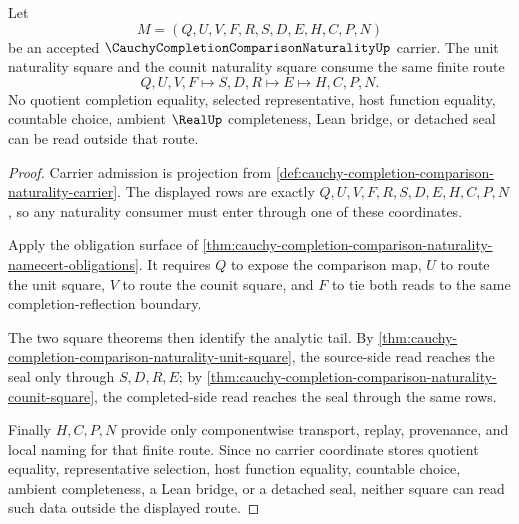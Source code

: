 \begin{theorem}
\label{thm:cauchy-completion-comparison-naturality-seal-exhaustion}
Let
$$
M=(Q,U,V,F,R,S,D,E,H,C,P,N)
$$
be an accepted $\CauchyCompletionComparisonNaturalityUp$ carrier. The unit naturality square and the counit naturality square consume the same finite route
$$
Q,U,V,F \longmapsto S,D,R \longmapsto E \longmapsto H,C,P,N .
$$
No quotient completion equality, selected representative, host function equality, countable choice, ambient $\RealUp$ completeness, Lean bridge, or detached seal can be read outside that route.
\end{theorem}
\begin{proof}
Carrier admission is projection from \autoref{def:cauchy-completion-comparison-naturality-carrier}. The displayed rows are exactly $Q,U,V,F,R,S,D,E,H,C,P,N$, so any naturality consumer must enter through one of these coordinates.

Apply the obligation surface of \autoref{thm:cauchy-completion-comparison-naturality-namecert-obligations}. It requires $Q$ to expose the comparison map, $U$ to route the unit square, $V$ to route the counit square, and $F$ to tie both reads to the same completion-reflection boundary.

The two square theorems then identify the analytic tail. By \autoref{thm:cauchy-completion-comparison-naturality-unit-square}, the source-side read reaches the seal only through $S,D,R,E$; by \autoref{thm:cauchy-completion-comparison-naturality-counit-square}, the completed-side read reaches the seal through the same rows.

Finally $H,C,P,N$ provide only componentwise transport, replay, provenance, and local naming for that finite route. Since no carrier coordinate stores quotient equality, representative selection, host function equality, countable choice, ambient completeness, a Lean bridge, or a detached seal, neither square can read such data outside the displayed route.
\end{proof}


